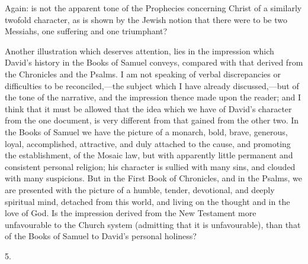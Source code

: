 Again: is not the apparent tone of the Prophecies concerning Christ
of a similarly twofold character, as is shown by the Jewish notion
that there were to be two Messiahs, one suffering and one triumphant?

Another illustration which deserves attention, lies in the
impression which David's history in the Books of Samuel conveys,
compared with that derived from the Chronicles and the Psalms. I am
not speaking of verbal discrepancies or difficulties to be
reconciled,—the subject which I have already discussed,—but of the
tone of the narrative, and the impression thence made upon the reader;
and I think that it must be allowed that the idea which we have of
David's character from the one document, is very different from that
gained from the other two. In the Books of Samuel we have the picture
of a monarch, bold, brave, generous, loyal, accomplished, attractive,
and duly attached to the cause, and promoting the establishment, of
the Mosaic law, but with apparently little permanent and consistent
personal religion; his character is sullied with many sins, and
clouded with many suspicions. But in the First Book of Chronicles, and
in the Psalms, we are presented with the picture of a humble, tender,
devotional, and deeply spiritual mind, detached from this world, and
living on the thought and in the love of God. Is the impression
derived from the New Testament more unfavourable to the Church system
(admitting that it is unfavourable), than that of the Books of Samuel
to David's personal holiness?

5.

